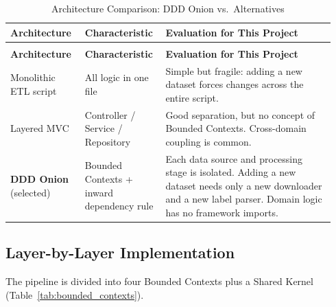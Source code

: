 \documentclass[a4paper]{article}
\begin{document}
\begin{longtable}{@{}
    >{\raggedright\arraybackslash}p{0.22\linewidth}
    >{\raggedright\arraybackslash}p{0.22\linewidth}
    >{\raggedright\arraybackslash}p{0.50\linewidth}@{}}

    \caption{Architecture Comparison: DDD Onion vs.\ Alternatives}\label{tab:arch_compare} \\
    \toprule
    \textbf{Architecture} & \textbf{Characteristic} & \textbf{Evaluation for This Project} \\
    \midrule
    \endfirsthead
    \multicolumn{3}{l}{\footnotesize\itshape (Table~\ref{tab:arch_compare} continued)}\\
    \toprule
    \textbf{Architecture} & \textbf{Characteristic} & \textbf{Evaluation for This Project} \\
    \midrule
    \endhead
    \bottomrule
    \endlastfoot

    Monolithic ETL script & All logic in one file & Simple but fragile: adding a new dataset forces changes across the entire script. \\
    \addlinespace
    Layered MVC & Controller / Service / Repository & Good separation, but no concept of Bounded Contexts. Cross-domain coupling is common. \\
    \addlinespace
    \textbf{DDD Onion} (selected) & Bounded Contexts + inward dependency rule & Each data source and processing stage is isolated. Adding a new dataset needs only a new downloader and a new label parser. Domain logic has no framework imports. \\
\end{longtable}

\subsection{Layer-by-Layer Implementation}

The pipeline is divided into four Bounded Contexts plus a Shared Kernel (Table~\ref{tab:bounded_contexts}).
\end{document}
